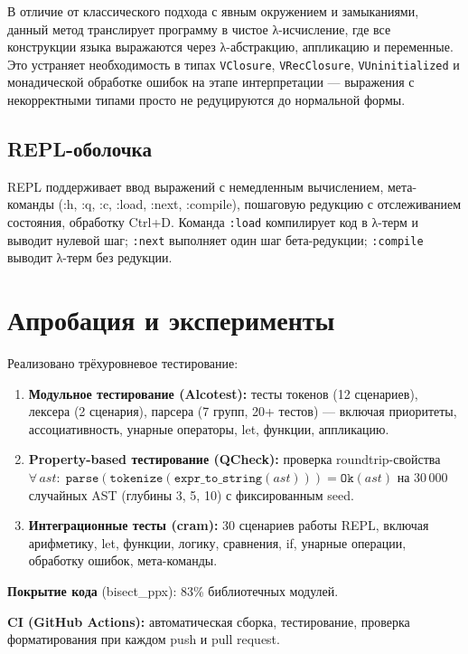 \documentclass[a4paper]{article}
\begin{document}
В отличие от классического подхода с явным окружением и замыканиями, данный метод транслирует программу в чистое λ-исчисление, где все конструкции языка выражаются через λ-абстракцию, аппликацию и переменные. Это устраняет необходимость в типах \texttt{VClosure}, \texttt{VRecClosure}, \texttt{VUninitialized} и монадической обработке ошибок на этапе интерпретации — выражения с некорректными типами просто не редуцируются до нормальной формы.

\subsection{REPL-оболочка}

REPL поддерживает ввод выражений с немедленным вычислением, мета-команды (:h, :q, :c, :load, :next, :compile), пошаговую редукцию с отслеживанием состояния, обработку Ctrl+D. Команда \texttt{:load} компилирует код в λ-терм и выводит нулевой шаг; \texttt{:next} выполняет один шаг бета-редукции; \texttt{:compile} выводит λ-терм без редукции.

\section{Апробация и эксперименты}

Реализовано трёхуровневое тестирование:

\begin{enumerate}
    \item \textbf{Модульное тестирование (Alcotest):} тесты токенов (12 сценариев), лексера (2 сценария), парсера (7 групп, 20+ тестов) — включая приоритеты, ассоциативность, унарные операторы, let, функции, аппликацию.
    
    \item \textbf{Property-based тестирование (QCheck):} проверка roundtrip-свойства $\forall\,\mathit{ast}:\;\texttt{parse}(\texttt{tokenize}(\texttt{expr\_to\_string}(\mathit{ast}))) = \texttt{Ok}(\mathit{ast})$ на 30\,000 случайных AST (глубины 3, 5, 10) с фиксированным seed.
    
    \item \textbf{Интеграционные тесты (cram):} 30 сценариев работы REPL, включая арифметику, let, функции, логику, сравнения, if, унарные операции, обработку ошибок, мета-команды.
\end{enumerate}

\textbf{Покрытие кода} (bisect\_ppx): 83\% библиотечных модулей.

\textbf{CI (GitHub Actions):} автоматическая сборка, тестирование, проверка форматирования при каждом push и pull request.
\end{document}
